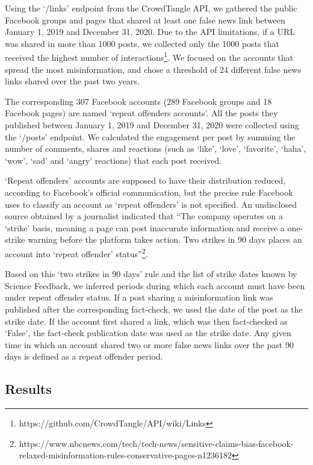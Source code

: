 \documentclass[11pt,a4paper]{article}
\begin{document}
Using the `/links' endpoint from the CrowdTangle API, we gathered the public Facebook groups and pages that shared at least one false news link between January 1, 2019 and December 31, 2020. 
Due to the API limitations, if a URL was shared in more than 1000 posts, we collected only the 1000 posts that received the highest number of interactions\footnote{https://github.com/CrowdTangle/API/wiki/Links}. 
We focused on the accounts that spread the most misinformation, and chose a threshold of 24 different false news links shared over the past two years. 

The corresponding 307 Facebook accounts (289 Facebook groups and 18 Facebook pages) are named `repeat offenders accounts'. 
All the posts they published between January 1, 2019 and December 31, 2020 were collected using the `/posts' endpoint. 
We calculated the engagement per post by summing the number of comments, shares and reactions (such as ‘like’, ‘love’, ‘favorite’, ‘haha’, ‘wow’, ‘sad’ and ‘angry’ reactions) that each post received.

`Repeat offenders' accounts are supposed to have their distribution reduced, according to Facebook's official communication, but the precise rule Facebook uses to classify an account as `repeat offenders' is not specified. 
An undisclosed source obtained by a journalist indicated that ``The company operates on a `strike' basis, meaning a page can post inaccurate information and receive a one-strike warning before the platform takes action. 
Two strikes in 90 days places an account into `repeat offender' status''\footnote{https://www.nbcnews.com/tech/tech-news/sensitive-claims-bias-facebook-relaxed-misinformation-rules-conservative-pages-n1236182}.

Based on this `two strikes in 90 days' rule and the list of strike dates known by Science Feedback, we inferred periods during which each account must have been under repeat offender status. 
If a post sharing a misinformation link was published after the corresponding fact-check, we used the date of the post as the strike date. 
If the account first shared a link, which was then fact-checked as `False', the fact-check publication date was used as the strike date. 
Any given time in which an account shared two or more false news links over the past 90 days is defined as a repeat offender period.

\subsection{Results}
\end{document}

